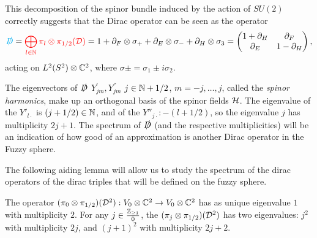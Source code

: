 \lin

This decomposition of the spinor bundle induced by the action of $SU(2)$ correctly suggests that the Dirac operator can be seen as the operator
\begin{equation}
    \textcolor{cyan}{\slashed D} = \textcolor{red}{ \bigoplus_{l\in \mathbb{N}} \pi_l  \otimes \pi_{1/2}(\mathcal D)} = 1 + \partial_F \otimes \sigma_+ + \partial_E \otimes \sigma_- + \partial_H \otimes \sigma_3 = \begin{pmatrix} 1 + \partial_H & \partial_F \\ \partial_E & 1 - \partial_H\end{pmatrix} ,
\end{equation} acting on $L^2(S^2)\otimes \mathbb{C}^2$, where $\sigma \pm = \sigma_1 \pm i \sigma_2$.

The eigenvectors of $\slashed D$ $Y^{'}_{jm}, Y^{''}_{jm}$ $j \in \mathbb{N} + 1/2$, $m = -j, \dots, j$, called the \textit{spinor harmonics}, make up an orthogonal basis of the spinor fields $\mathcal H$. The eigenvalue of the $Y'_{l\cdot}$ is $(j + 1/2) \in \mathbb{N}$, and of the $Y{''}_{j\cdot}: -(l + 1/2)$, so the eigenvalue $j$ has multiplicity $2j+1$. The spectrum of $\slashed D$ (and the respective multiplicities) will be an indication of how good of an approximation is another Dirac operator in the Fuzzy sphere. 

{\color{gray}
The following aiding lemma will allow us to study the spectrum of the dirac operators of the dirac triples that will be defined on the fuzzy sphere.

\begin{lemma}\label{lemmaSpectrumAlgebraic}
The operator $(\pi_0 \otimes \pi_{1/2})(\mathcal D^2): V_0 \otimes \mathbb{C}^2 \to V_0 \otimes \mathbb{C}^2$ has as unique eigenvalue $1$ with multiplicity $2$. For any $j \in \frac{\mathbb{Z}_{\geq 1}}{0}$, the $(\pi_j \otimes \pi_{1/2})(\mathcal D^2)$ has two eigenvalues: $j^2$ with multiplicity $2j$, and $(j+1)^2$ with multiplicity $2j+2$.
\end{lemma}

}

\linea

